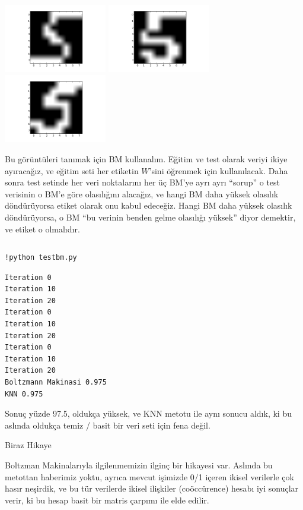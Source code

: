 \documentclass[12pt,fleqn]{article}\usepackage{../../common}
\begin{document}
\includegraphics[height=3cm]{boltzmann_01.png}
\includegraphics[height=3cm]{boltzmann_02.png}
\includegraphics[height=3cm]{boltzmann_03.png}

Bu görüntüleri tanımak için BM kullanalım. Eğitim ve test olarak veriyi
ikiye ayıracağız, ve eğitim seti her etiketin $W$'sini öğrenmek için
kullanılacak. Daha sonra test setinde her veri noktalarını her üç BM'ye
ayrı ayrı ``sorup'' o test verisinin o BM'e göre olasılığını alacağız, ve
hangi BM daha yüksek olasılık döndürüyorsa etiket olarak onu kabul
edeceğiz. Hangi BM daha yüksek olasılık döndürüyorsa, o BM ``bu verinin
benden gelme olasılığı yüksek'' diyor demektir, ve etiket o olmalıdır.

\inputminted[fontsize=\footnotesize]{python}{testbm.py}

\begin{verbatim}
!python testbm.py
\end{verbatim}

\begin{verbatim}
Iteration 0
Iteration 10
Iteration 20
Iteration 0
Iteration 10
Iteration 20
Iteration 0
Iteration 10
Iteration 20
Boltzmann Makinasi 0.975
KNN 0.975
\end{verbatim}

Sonuç yüzde 97.5, oldukça yüksek, ve KNN metotu ile aynı sonucu aldık, ki
bu aslında oldukça temiz / basit bir veri seti için fena değil.

Biraz Hikaye

Boltzman Makinalarıyla ilgilenmemizin ilginç bir hikayesi var. Aslında bu
metottan haberimiz yoktu, ayrıca mevcut işimizde 0/1 içeren ikisel
verilerle çok hasır neşirdik, ve bu tür verilerde ikisel ilişkiler
(coöccürence) hesabı iyi sonuçlar verir, ki bu hesap basit bir matris
çarpımı ile elde edilir.
\end{document}
